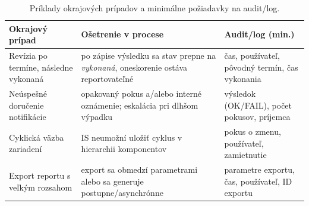 \begin{table}[!htbp]
\centering
\footnotesize
\renewcommand{\arraystretch}{1.2}
\begin{tabularx}{\textwidth}{>{\raggedright\arraybackslash}p{40mm} >{\raggedright\arraybackslash}X >{\raggedright\arraybackslash}p{40mm}}
\toprule
\textbf{Okrajový prípad} & \textbf{Ošetrenie v procese} & \textbf{Audit/log (min.)} \\
\midrule
Revízia po termíne, následne vykonaná & po zápise výsledku sa stav prepne na \emph{vykonaná}, oneskorenie ostáva reportovateľné & čas, používateľ, pôvodný termín, čas vykonania \\
\midrule
Neúspešné doručenie notifikácie & opakovaný pokus a/alebo interné oznámenie; eskalácia pri dlhšom výpadku & výsledok (OK/FAIL), počet pokusov, príjemca \\
\midrule
Cyklická väzba zariadení & IS neumožní uložiť cyklus v hierarchii komponentov & pokus o zmenu, používateľ, zamietnutie \\
\midrule
Export reportu s veľkým rozsahom & export sa obmedzí parametrami alebo sa generuje postupne/asynchrónne & parametre exportu, čas, používateľ, ID exportu \\
\bottomrule
\end{tabularx}
\caption{Príklady okrajových prípadov a minimálne požiadavky na audit/log.}
\label{tab:edge-cases}
\end{table}
